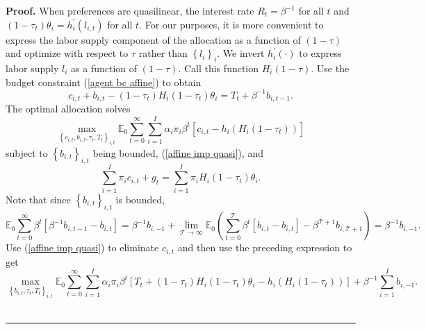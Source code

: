 \documentclass[thmsb,11pt]{article}
\newenvironment{proof}[1][Proof]{\noindent \textbf{#1.} }{\  \rule{0.5em}{0.5em}}
\begin{document}
\begin{proof}
When preferences are quasilinear, the interest rate $R_{t}=\beta
^{-1}$ for all $t$ and %
$\left( 1-\tau _{t}\right) \theta _{i}=h_{i}^{\prime }(l_{i,t})$ for all $%
t.$ For our purposes, it is more convenient to express the labor supply
component of the allocation as a function of $\left( 1-\tau \right) $ and
optimize with respect to $\tau $ rather than $\left\{ l_{i}\right\} _{i}.$
We  invert  $h_{i}^{\prime }(\cdot )$ to express labor supply $%
l_{i}$ as a function of $\left( 1-\tau \right) .$ Call this function $%
H_{i}\left( 1-\tau \right) $. Use the budget
constraint (\ref{agent bc affine}) to obtain
\begin{equation}
c_{i,t}+b_{i,t}-\left( 1-\tau _{t}\right) H_{i}\left( 1-\tau _{t}\right)\theta_i
=T_{t}+\beta ^{-1}b_{i,t-1}.  \label{affine imp quasi}
\end{equation}%
The optimal allocation solves
\begin{equation}
\max_{\left\{ c_{i,t},b_{i,t},\tau_t,T_{t}\right\} _{i,t}}\mathbb{E}%
_{0}\sum_{t=0}^{\infty }\sum_{i=1}^{I}\alpha _{i}\pi _{i}\beta ^{t}\left[
c_{i,t}-h_{i}\left( H_{i}\left( 1-\tau_t \right) \right) \right]
\label{AMSS max}
\end{equation}%
subject to $\left\{ b_{i,t}\right\} _{i,t}$ being bounded, (\ref{affine imp
quasi}), and
\begin{equation*}
\sum_{i=1}^{I}\pi _{i}c_{i,t}+g_{t}=\sum_{i=1}^{I}\pi _{i} H_{i}\left( 1-\tau _{t}\right)\theta_i .
\end{equation*}%
Note that since $\left\{ b_{i,t}\right\} _{i,t}$ is bounded,
\begin{equation*}
\mathbb{E}_{0}\sum_{t=0}^{\infty }\beta ^{t}\left[ \beta
^{-1}b_{i,t-1}-b_{i,t}\right] =\beta ^{-1}b_{i,-1}+\lim_{\mathcal{T}%
\rightarrow \infty }\mathbb{E}_{0}\left( \sum_{t=0}^{\mathcal{T}}\beta ^{t}%
\left[ b_{i,t}-b_{i,t}\right] -\beta ^{\mathcal{T}+1}b_{i,\mathcal{T}%
+1}\right) =\beta ^{-1}b_{i,-1}.
\end{equation*}%
Use (\ref{affine imp quasi}) to eliminate $c_{i,t}$ and then use  the preceding
expression  to get
\begin{equation}
\max_{\left\{ b_{i,t},\tau _{t},T_{t}\right\} _{i,t}}\mathbb{E}%
_{0}\sum_{t=0}^{\infty }\sum_{i=1}^{I}\alpha _{i}\pi _{i}\beta ^{t}\left[
T_{t}+\left( 1-\tau _{t}\right) H_{i}\left( 1-\tau _{t}\right)\theta_i -h_{i}\left(
H_{i}\left( 1-\tau_t \right) \right) \right] +\beta
^{-1}\sum_{i=1}^{I}b_{i,-1}.  \label{quasilinear max}

\end{equation}
\end{proof}
\end{document}
